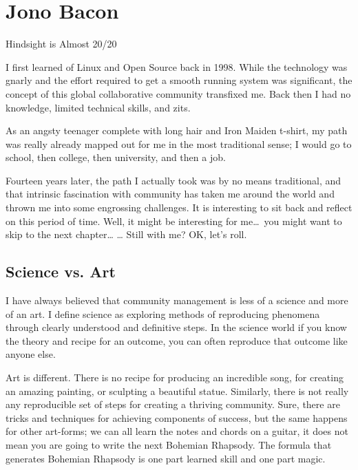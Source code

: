 
\chapter{Jono Bacon}{Hindsight is Almost 20/20}

I first learned of Linux and Open Source back in 1998. While the technology was
gnarly and the effort required to get a smooth running system was significant,
the concept of this global collaborative community transfixed me. Back then I
had no knowledge, limited technical skills, and zits.

As an angsty teenager complete with long hair and Iron Maiden t-shirt, my path
was really already mapped out for me in the most traditional sense; I would go
to school, then college, then university, and then a job.

Fourteen years later, the path I actually took was by no means traditional, and
that intrinsic fascination with community has taken me around the world and
thrown me into some engrossing challenges. It is interesting to sit back and
reflect on this period of time. Well, it might be interesting for me\dots\ you
might want to skip to the next chapter\dots 
\newline
\dots
\newline
Still with me? OK, let’s roll.

\section*{Science vs. Art}

I have always believed that community management is less of a science and more
of an art. I define science as exploring methods of reproducing phenomena
through clearly understood and definitive steps. In the science world if you
know the theory and recipe for an outcome, you can often reproduce that outcome
like anyone else.

Art is different. There is no recipe for producing an incredible song, for
creating an amazing painting, or sculpting a beautiful statue. Similarly, there
is not really any reproducible set of steps for creating a thriving community.
Sure, there are tricks and techniques for achieving components of success, but
the same happens for other art-forms; we can all learn the notes and chords on a
guitar, it does not mean you are going to write the next Bohemian Rhapsody. The
formula that generates Bohemian Rhapsody is one part learned skill and one part
magic.

